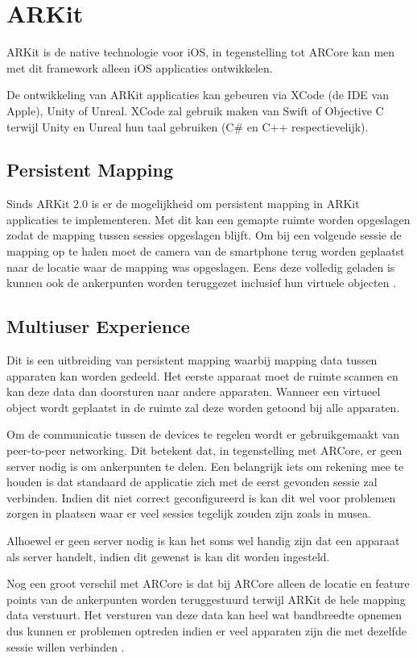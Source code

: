 \section{ARKit}
ARKit is de native technologie voor iOS, in tegenstelling tot ARCore kan men met dit framework alleen iOS applicaties ontwikkelen.

De ontwikkeling van ARKit applicaties kan gebeuren via XCode (de IDE van Apple), Unity of Unreal. XCode zal gebruik maken van Swift of Objective C terwijl Unity en Unreal hun taal gebruiken (C\# en C++ respectievelijk).

\subsection{Persistent Mapping}
Sinds ARKit 2.0 is er de mogelijkheid om persistent mapping in ARKit applicaties te implementeren. Met dit kan een gemapte ruimte worden opgeslagen zodat de mapping tussen sessies opgeslagen blijft.
Om bij een volgende sessie de mapping op te halen moet de camera van de smartphone terug worden geplaatst naar de locatie waar de mapping was opgeslagen. Eens deze volledig geladen is kunnen ook de ankerpunten worden teruggezet inclusief hun virtuele objecten \autocite{ARKitPersistent}.

\subsection{Multiuser Experience}
Dit is een uitbreiding van persistent mapping waarbij mapping data tussen apparaten kan worden gedeeld. Het eerste apparaat moet de ruimte scannen en kan deze data dan doorsturen naar andere apparaten. Wanneer een virtueel object wordt geplaatst in de ruimte zal deze worden getoond bij alle apparaten.

Om de communicatie tussen de devices te regelen wordt er gebruikgemaakt van peer-to-peer networking. Dit betekent dat, in tegenstelling met ARCore, er geen server nodig is om ankerpunten te delen. Een belangrijk iets om rekening mee te houden is dat standaard de applicatie zich met de eerst gevonden sessie zal verbinden. Indien dit niet correct geconfigureerd is kan dit wel voor problemen zorgen in plaatsen waar er veel sessies tegelijk zouden zijn zoals in musea.

Alhoewel er geen server nodig is kan het soms wel handig zijn dat een apparaat als server handelt, indien dit gewenst is kan dit worden ingesteld.

Nog een groot verschil met ARCore is dat bij ARCore alleen de locatie en feature points van de ankerpunten worden teruggestuurd terwijl ARKit de hele mapping data verstuurt. Het versturen van deze data kan heel wat bandbreedte opnemen dus kunnen er problemen optreden indien er veel apparaten zijn die met dezelfde sessie willen verbinden \autocite{ARKitMultiuser}.

